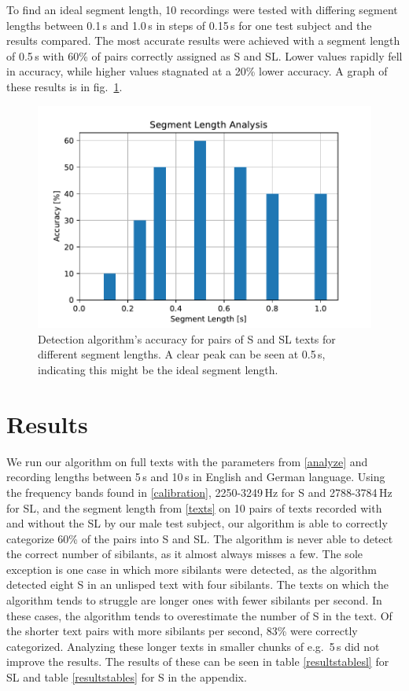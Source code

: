 \documentclass{IEEEtran}
\begin{document}
To find an ideal segment length,
10 recordings were tested with differing segment lengths between 0.1\,s and 1.0\,s in steps of 0.15\,s for one test subject and the results compared.
The most accurate results were achieved with a segment length of 0.5\,s with 60\% of pairs correctly assigned as S and SL.
Lower values rapidly fell in accuracy,
while higher values stagnated at a 20\% lower accuracy.
A graph of these results is in fig.\ \ref{segmentlength}.

\begin{figure}[h]
\centering
\includegraphics[scale=0.5]{seglen.pdf}
\caption{Detection algorithm's accuracy for pairs of S and SL texts for different segment lengths. A clear peak can be seen at 0.5\,s, indicating this might be the ideal segment length.}\label{segmentlength}
\end{figure}

\section{Results}

We run our algorithm on full texts with the parameters from \ref{analyze} and recording lengths between 5\,s and 10\,s in English and German language.
Using the frequency bands found in \ref{calibration}, 2250-3249\,Hz for S and 2788-3784\,Hz for SL, and the segment length from \ref{texts} on 10 pairs of texts recorded with and without the SL by our male test subject,
our algorithm is able to correctly categorize 60\% of the pairs into S and SL.
The algorithm is never able to detect the correct number of sibilants,
as it almost always misses a few.
The sole exception is one case in which more sibilants were detected,
as the algorithm detected eight S in an unlisped text with four sibilants.
The texts on which the algorithm tends to struggle are longer ones with fewer sibilants per second.
In these cases,
the algorithm tends to overestimate the number of S in the text.
Of the shorter text pairs with more sibilants per second,
83\% were correctly categorized.
Analyzing these longer texts in smaller chunks of e.g.\ 5\,s did not improve the results.
The results of these can be seen in table \ref{resultstablesl} for SL and table \ref{resultstables} for S in the appendix.
\end{document}
